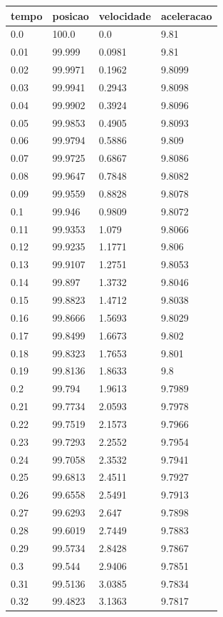 \begin{tabular}{llll}
\toprule
tempo & posicao & velocidade & aceleracao \\
\midrule
0.0 & 100.0 & 0.0 & 9.81 \\
0.01 & 99.999 & 0.0981 & 9.81 \\
0.02 & 99.9971 & 0.1962 & 9.8099 \\
0.03 & 99.9941 & 0.2943 & 9.8098 \\
0.04 & 99.9902 & 0.3924 & 9.8096 \\
0.05 & 99.9853 & 0.4905 & 9.8093 \\
0.06 & 99.9794 & 0.5886 & 9.809 \\
0.07 & 99.9725 & 0.6867 & 9.8086 \\
0.08 & 99.9647 & 0.7848 & 9.8082 \\
0.09 & 99.9559 & 0.8828 & 9.8078 \\
0.1 & 99.946 & 0.9809 & 9.8072 \\
0.11 & 99.9353 & 1.079 & 9.8066 \\
0.12 & 99.9235 & 1.1771 & 9.806 \\
0.13 & 99.9107 & 1.2751 & 9.8053 \\
0.14 & 99.897 & 1.3732 & 9.8046 \\
0.15 & 99.8823 & 1.4712 & 9.8038 \\
0.16 & 99.8666 & 1.5693 & 9.8029 \\
0.17 & 99.8499 & 1.6673 & 9.802 \\
0.18 & 99.8323 & 1.7653 & 9.801 \\
0.19 & 99.8136 & 1.8633 & 9.8 \\
0.2 & 99.794 & 1.9613 & 9.7989 \\
0.21 & 99.7734 & 2.0593 & 9.7978 \\
0.22 & 99.7519 & 2.1573 & 9.7966 \\
0.23 & 99.7293 & 2.2552 & 9.7954 \\
0.24 & 99.7058 & 2.3532 & 9.7941 \\
0.25 & 99.6813 & 2.4511 & 9.7927 \\
0.26 & 99.6558 & 2.5491 & 9.7913 \\
0.27 & 99.6293 & 2.647 & 9.7898 \\
0.28 & 99.6019 & 2.7449 & 9.7883 \\
0.29 & 99.5734 & 2.8428 & 9.7867 \\
0.3 & 99.544 & 2.9406 & 9.7851 \\
0.31 & 99.5136 & 3.0385 & 9.7834 \\
0.32 & 99.4823 & 3.1363 & 9.7817 \\

\end{tabular}
